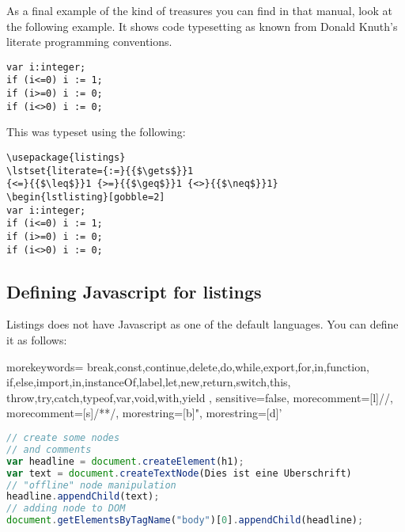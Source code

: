 As a final example of the kind of treasures you can find in that manual, look at
the following example. It shows code typesetting as known from Donald Knuth’s
literate programming conventions.

\begin{lstlisting}[gobble=2]
var i:integer;
if (i<=0) i := 1;
if (i>=0) i := 0;
if (i<>0) i := 0;
\end{lstlisting}

This was typeset using the following:

\begin{teX}
\begin{lstlisting}[language={[common]TeX},% 
                           alsolanguage={[LaTeX]TeX},% 
                           alsolanguage={[primitive]TeX},%
                           alsolanguage={Verse}]
\usepackage{listings}
\lstset{literate={:=}{{$\gets$}}1
{<=}{{$\leq$}}1 {>=}{{$\geq$}}1 {<>}{{$\neq$}}1}
\begin{lstlisting}[gobble=2]
var i:integer;
if (i<=0) i := 1;
if (i>=0) i := 0;
if (i<>0) i := 0;
\end{lstlisting}
\end{teX}

\normalsize


\subsection{Defining Javascript for listings}

Listings does not have Javascript as one of the default languages. You can define it as follows:


 {
	morekeywords={
		break,const,continue,delete,do,while,export,for,in,function,
		if,else,import,in,instanceOf,label,let,new,return,switch,this,
		throw,try,catch,typeof,var,void,with,yield
	},
	sensitive=false,
	morecomment=[l]{//},
	morecomment=[s]{/*}{*/},
	morestring=[b]",
	morestring=[d]'
}

\begin{lstlisting}[language=JavaScript]
// create some nodes
// and comments
var headline = document.createElement(h1);
var text = document.createTextNode(Dies ist eine Uberschrift)
// "offline" node manipulation
headline.appendChild(text);
// adding node to DOM
document.getElementsByTagName("body")[0].appendChild(headline);
\end{lstlisting}


